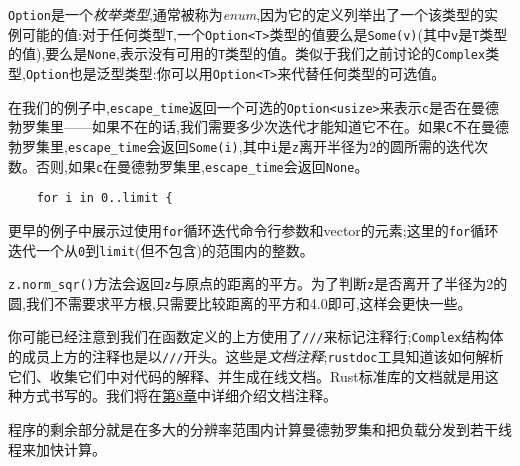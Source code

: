 \texttt{Option}是一个\emph{枚举类型},通常被称为\emph{enum},因为它的定义列举出了一个该类型的实例可能的值:对于任何类型\texttt{T},一个\texttt{Option<T>}类型的值要么是\texttt{Some(v)}(其中\texttt{v}是\texttt{T}类型的值),要么是\texttt{None},表示没有可用的\texttt{T}类型的值。类似于我们之前讨论的\texttt{Complex}类型,\texttt{Option}也是泛型类型:你可以用\texttt{Option<T>}来代替任何类型的可选值。

在我们的例子中,\texttt{escape\_time}返回一个可选的\texttt{Option<usize>}来表示\texttt{c}是否在曼德勃罗集里——如果不在的话,我们需要多少次迭代才能知道它不在。如果\texttt{C}不在曼德勃罗集里,\texttt{escape\_time}会返回\texttt{Some(i)},其中\texttt{i}是\texttt{z}离开半径为2的圆所需的迭代次数。否则,如果\texttt{c}在曼德勃罗集里,\texttt{escape\_time}会返回\texttt{None}。
\begin{verbatim}
    for i in 0..limit {
\end{verbatim}

更早的例子中展示过使用\texttt{for}循环迭代命令行参数和vector的元素;这里的\texttt{for}循环迭代一个从\texttt{0}到\texttt{limit}(但不包含)的范围内的整数。

\texttt{z.norm\_sqr()}方法会返回\texttt{z}与原点的距离的平方。为了判断\texttt{z}是否离开了半径为2的圆,我们不需要求平方根,只需要比较距离的平方和4.0即可,这样会更快一些。

你可能已经注意到我们在函数定义的上方使用了\texttt{///}来标记注释行;\texttt{Complex}结构体的成员上方的注释也是以\texttt{///}开头。这些是\emph{文档注释};\texttt{rustdoc}工具知道该如何解析它们、收集它们中对代码的解释、并生成在线文档。Rust标准库的文档就是用这种方式书写的。我们将在\hyperref[ch08]{第8章}中详细介绍文档注释。

程序的剩余部分就是在多大的分辨率范围内计算曼德勃罗集和把负载分发到若干线程来加快计算。

